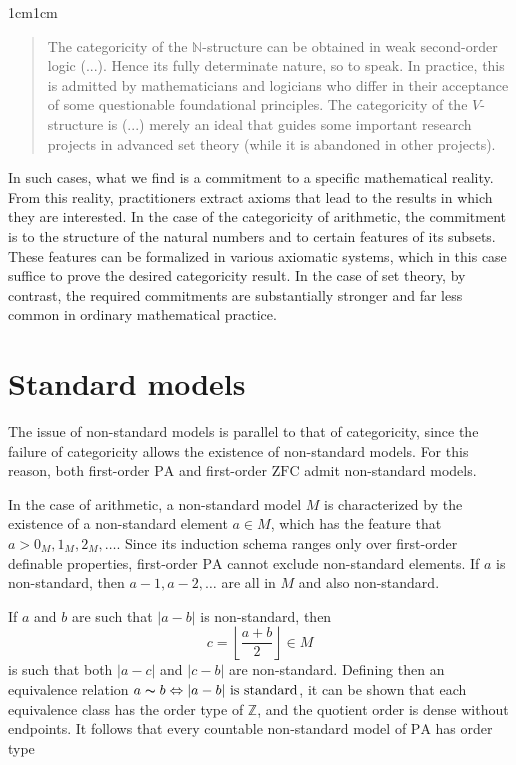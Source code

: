 \documentclass[11pt,a4paper]{book}
\theoremstyle{plain}
\begin{document}
\begin{adjustwidth}{1cm}{1cm}
\begin{quote}
\small
The categoricity of the $\mathbb{N}$-structure can be obtained in weak second-order logic (...). Hence its fully determinate nature, so to speak. In practice, this is admitted by mathematicians and logicians who differ in their acceptance of some questionable foundational principles. The categoricity of the $V$-structure is (...) merely an ideal that guides some important research projects in advanced set theory (while it is abandoned in other projects).
\end{quote}
\end{adjustwidth}

In such cases, what we find is a commitment to a specific mathematical reality. From this reality, practitioners extract axioms that lead to the results in which they are interested. In the case of the categoricity of arithmetic, the commitment is to the structure of the natural numbers and to certain features of its subsets. These features can be formalized in various axiomatic systems, which in this case suffice to prove the desired categoricity result. In the case of set theory, by contrast, the required commitments are substantially stronger and far less common in ordinary mathematical practice.

\section{Standard models}
\label{standard-models}

The issue of non-standard models is parallel to that of categoricity, since the failure of categoricity allows the existence of non-standard models. For this reason, both first-order $\mathrm{PA}$ and first-order $\mathrm{ZFC}$ admit non-standard models. 

In the case of arithmetic, a non-standard model $M$ is characterized by the existence of a non-standard element $a \in M$, which has the feature that $a > 0_M, 1_M, 2_M, \dots$. Since its induction schema ranges only over first-order definable properties, first-order  $\mathrm{PA}$ cannot exclude non-standard elements. If $a$ is non-standard, then $a-1,a-2,\dots$ are all in $M$ and also non-standard. 

If $a$ and $b$ are such that $|a-b|$ is non-standard, then $$c = \left\lfloor \frac{a+b}{2} \right\rfloor \in M $$ is such that both $|a-c|$ and $|c-b|$ are non-standard. Defining then an equivalence relation $a\thicksim b \Leftrightarrow |a-b| \text{ is standard}$, it can be shown that each equivalence class has the order type of $\mathbb{Z}$, and the quotient order is dense without endpoints. It follows that every countable non-standard model of $\mathrm{PA}$ has order type
\end{document}
